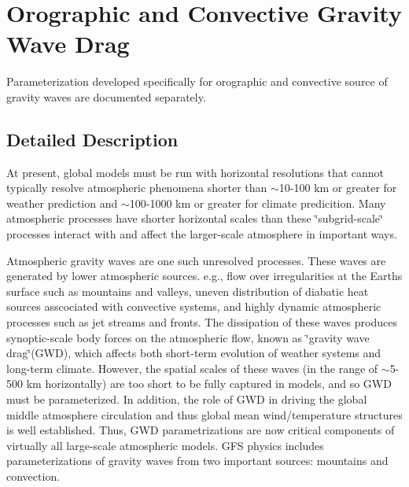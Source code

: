 \hypertarget{group__gwd}{}\section{Orographic and Convective Gravity Wave Drag}
\label{group__gwd}


Parameterization developed specifically for orographic and convective source of gravity waves are documented separately.  




\subsection{Detailed Description}
At present, global models must be run with horizontal resolutions that cannot typically resolve atmospheric phenomena shorter than $\sim$10-\/100 km or greater for weather prediction and $\sim$100-\/1000 km or greater for climate predicition. Many atmospheric processes have shorter horizontal scales than these \char`\"{}subgrid-\/scale\char`\"{} processes interact with and affect the larger-\/scale atmosphere in important ways.

Atmospheric gravity waves are one such unresolved processes. These waves are generated by lower atmospheric sources. e.\+g., flow over irregularities at the Earth\textquotesingle{}s surface such as mountains and valleys, uneven distribution of diabatic heat sources asscociated with convective systems, and highly dynamic atmospheric processes such as jet streams and fronts. The dissipation of these waves produces synoptic-\/scale body forces on the atmospheric flow, known as \char`\"{}gravity wave drag\char`\"{}(G\+WD), which affects both short-\/term evolution of weather systems and long-\/term climate. However, the spatial scales of these waves (in the range of $\sim$5-\/500 km horizontally) are too short to be fully captured in models, and so G\+WD must be parameterized. In addition, the role of G\+WD in driving the global middle atmosphere circulation and thus global mean wind/temperature structures is well established. Thus, G\+WD parametrizations are now critical components of virtually all large-\/scale atmospheric models. G\+FS physics includes parameterizations of gravity waves from two important sources\+: mountains and convection.

